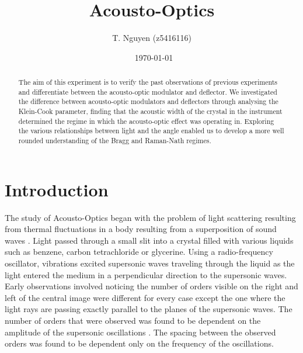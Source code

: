\documentclass[aps,prl,reprint,10pt,amsmath,amssymb,superscriptaddress,a4paper]{revtex4-2}
\begin{document}
\title{Acousto-Optics}

\author{T. Nguyen (z5416116)}
\date{\currenttime~\today}

\begin{abstract}
The aim of this experiment is to verify the past observations of previous experiments and differentiate between the acousto-optic modulator and deflector. We investigated the difference between acousto-optic modulators and deflectors through analysing the Klein-Cook parameter, 
finding that the acoustic width of the crystal in the instrument determined the regime in which the acousto-optic 
effect was operating in. Exploring the various relationships between light and the angle enabled us to develop a more well rounded understanding of the Bragg and Raman-Nath regimes.
\end{abstract}

\maketitle

\section{Introduction}
The study of Acousto-Optics began with the problem of light scattering resulting from thermal fluctuations in a body resulting from 
a superposition of sound waves \citep{Brillouin}. Light passed through a small slit into a crystal filled with various liquids such 
as benzene, carbon tetrachloride or glycerine. Using a radio-frequency oscillator, vibrations excited supersonic waves traveling 
through the liquid as the light entered the medium in a perpendicular direction to the supersonic waves. Early observations involved 
noticing the number of orders visible on the right and left of the central image were different for every case except the one where 
the light rays are passing exactly parallel to the planes of the supersonic waves. The number of orders that were observed was found 
to be dependent on the amplitude of the supersonic oscillations \citep{DebyeSears}. The spacing between the observed orders was found 
to be dependent only on the frequency of the oscillations.
\end{document}
